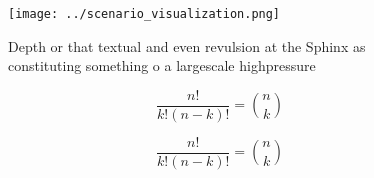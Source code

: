 \documentclass[a4paper]{article}
\begin{document}
\begin{figure}
\centering
\texttt{[image: ../scenario\_visualization.png]}
\caption{Depth or that textual and even revulsion at the Sphinx as constituting something o a largescale highpressure 
}
\end{figure}
 
\[ \frac{n!}{k!(n-k)!} = \binom{n}{k} \]

\[ \frac{n!}{k!(n-k)!} = \binom{n}{k} \]
\end{document}
